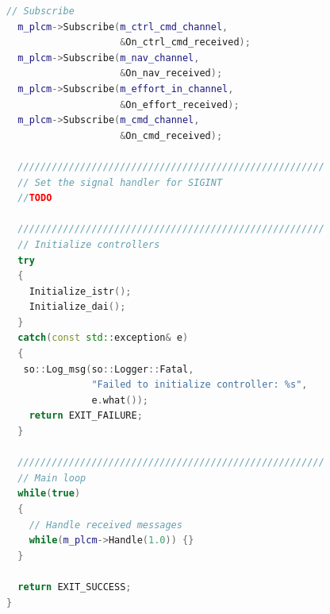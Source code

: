 \documentclass[applsci,article,submit,pdftex,moreauthors]{Definitions/mdpi}
\begin{document}
\begin{lstlisting}[language=c++]
  // Subscribe
  m_plcm->Subscribe(m_ctrl_cmd_channel,
                    &On_ctrl_cmd_received);
  m_plcm->Subscribe(m_nav_channel,
                    &On_nav_received);
  m_plcm->Subscribe(m_effort_in_channel,
                    &On_effort_received);
  m_plcm->Subscribe(m_cmd_channel,
                    &On_cmd_received);

  //////////////////////////////////////////////////////
  // Set the signal handler for SIGINT
  //TODO

  //////////////////////////////////////////////////////
  // Initialize controllers
  try
  {
    Initialize_istr();
    Initialize_dai();
  }
  catch(const std::exception& e)
  {
   so::Log_msg(so::Logger::Fatal,
               "Failed to initialize controller: %s",
               e.what());
    return EXIT_FAILURE;
  }

  //////////////////////////////////////////////////////
  // Main loop
  while(true)
  {
    // Handle received messages
    while(m_plcm->Handle(1.0)) {}
  }

  return EXIT_SUCCESS;
}
\end{lstlisting}
 
\end{document}
